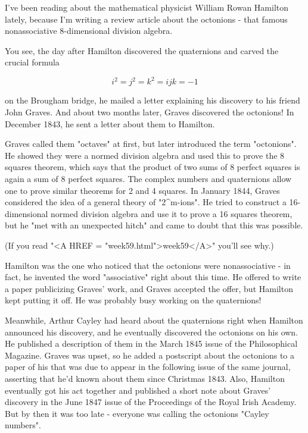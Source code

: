 


I've been reading about the mathematical physicist William Rowan 
Hamilton lately, because I'm writing a review article about the 
octonions - that famous nonassociative 8-dimensional division 
algebra.  

You see, the day after Hamilton discovered the quaternions and carved 
the crucial formula


$$

                i^{2} = j^{2} = k^{2} = ijk = -1
$$
    
on the Brougham bridge, he mailed a letter explaining his discovery
to his friend John Graves.  And about two months later, Graves 
discovered the octonions!  In December 1843, he sent a letter about 
them to Hamilton.   

Graves called them "octaves" at first, but later introduced
the term "octonions".  He showed they were a normed division
algebra and used this to prove the 8 squares theorem, which says that
the product of two sums of 8 perfect squares is again a sum of 8 perfect
squares.  The complex numbers and quaternions allow one to prove similar
theorems for 2 and 4 squares.  In January 1844, Graves considered the
idea of a general theory of "2^{m}-ions".  He tried 
to construct
a 16-dimensional normed division algebra and use it to prove a 16
squares theorem, but he "met with an unexpected hitch" and came to
doubt that this was possible.  

(If you read "<A HREF = "week59.html">week59</A>" you'll see why.)

Hamilton was the one who noticed that the octonions were nonassociative - in 
fact, he invented the word "associative" right about this time.  He 
offered to write a paper publicizing Graves' work, and Graves accepted 
the offer, but Hamilton kept putting it off.  He was probably busy 
working on the quaternions!  

Meanwhile, Arthur Cayley had heard about the quaternions right when 
Hamilton announced his discovery, and he eventually discovered the 
octonions on his own.  He published a description of them in the March 
1845 issue of the Philosophical Magazine.  Graves was upset, so he added 
a postscript about the octonions to a paper of his that was due to 
appear in the following issue of the same journal, asserting that 
he'd known about them since Christmas 1843.  Also, Hamilton eventually 
got his act together and published a short note about Graves' discovery 
in the June 1847 issue of the Proceedings of the Royal Irish Academy.  
But by then it was too late - everyone was calling the octonions "Cayley 
numbers".

